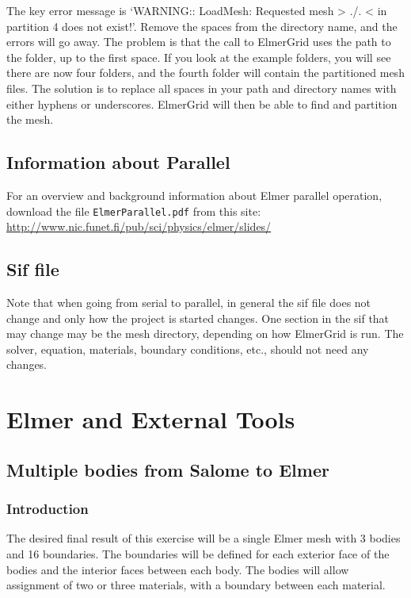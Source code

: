  The key error message is `WARNING:: LoadMesh: Requested mesh > ./. < in partition 4 does not exist!'.  Remove the spaces from the directory name, and the errors will go away.  The problem is that the call to ElmerGrid uses the path to the folder, up to the first space.  If you look at the example folders, you will see there are now four folders, and the fourth folder will contain the partitioned mesh files.  The solution is to replace all spaces in your path and directory names with either hyphens or underscores.  ElmerGrid will then be able to find and partition the mesh.


\section{Information about Parallel}

For an overview and background information about Elmer parallel operation, download the file \texttt{ElmerParallel.pdf} from this site:\\

\url{http://www.nic.funet.fi/pub/sci/physics/elmer/slides/}


\section{Sif file}

Note that when going from serial to parallel, in general the sif file does not change and only how the project is started changes.  One section in the sif that may change may be the mesh directory, depending on how ElmerGrid is run.  The solver, equation, materials, boundary conditions, etc., should not need any changes.


\chapter{Elmer and External Tools}

\section{Multiple bodies from Salome to Elmer}

\subsection{Introduction}

The desired final result of this exercise will be a single Elmer mesh with 3 bodies and 16 boundaries.  The boundaries will be defined for each exterior face of the bodies and the interior faces between each body.  The bodies will allow assignment of two or three materials, with a boundary between each material.\\

